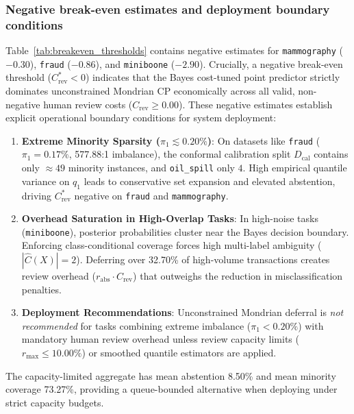 \documentclass{ieeetj}
\begin{document}
\subsubsection{Negative break-even estimates and deployment boundary conditions}
Table~\ref{tab:breakeven_thresholds} contains negative estimates for \texttt{mammography} ($-0.30$), \texttt{fraud} ($-0.86$), and \texttt{miniboone} ($-2.90$). Crucially, a negative break-even threshold ($C^*_{\mathrm{rev}} < 0$) indicates that the Bayes cost-tuned point predictor strictly dominates unconstrained Mondrian CP economically across all valid, non-negative human review costs ($C_{\mathrm{rev}} \ge 0.00$). These negative estimates establish explicit operational boundary conditions for system deployment:
\begin{enumerate}
    \item \textbf{Extreme Minority Sparsity ($\pi_1 \lesssim 0.20\%$)}: On datasets like \texttt{fraud} ($\pi_1 = 0.17\%$, 577.88:1 imbalance), the conformal calibration split $D_{\mathrm{cal}}$ contains only $\approx 49$ minority instances, and \texttt{oil\_spill} only $4$. High empirical quantile variance on $q_1$ leads to conservative set expansion and elevated abstention, driving $C_{\mathrm{rev}}^*$ negative on \texttt{fraud} and \texttt{mammography}.
    \item \textbf{Overhead Saturation in High-Overlap Tasks}: In high-noise tasks (\texttt{miniboone}), posterior probabilities cluster near the Bayes decision boundary. Enforcing class-conditional coverage forces high multi-label ambiguity ($|\hat{C}(X)|=2$). Deferring over 32.70\% of high-volume transactions creates review overhead ($r_{\mathrm{abs}} \cdot C_{\mathrm{rev}}$) that outweighs the reduction in misclassification penalties.
    \item \textbf{Deployment Recommendations}: Unconstrained Mondrian deferral is \textit{not recommended} for tasks combining extreme imbalance ($\pi_1 < 0.20\%$) with mandatory human review overhead unless review capacity limits ($r_{\max} \le 10.00\%$) or smoothed quantile estimators are applied.
\end{enumerate}
The capacity-limited aggregate has mean abstention 8.50\% and mean minority coverage 73.27\%, providing a queue-bounded alternative when deploying under strict capacity budgets.
\end{document}
